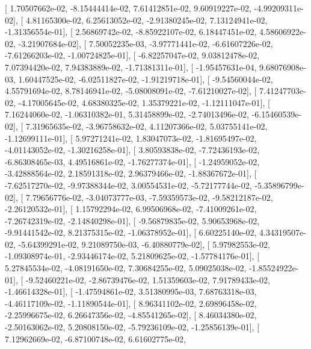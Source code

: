 \documentclass{article}
\begin{document}
       [  1.70507662e-02,  -8.15444414e-02,   7.61412851e-02,
          9.60919227e-02,  -4.99209311e-02],
       [  4.81165300e-02,   6.25613052e-02,  -2.91380245e-02,
          7.13124941e-02,  -1.31356554e-01],
       [  2.56869742e-02,  -8.85922107e-02,   6.18447451e-02,
          4.58606922e-02,  -3.21907684e-02],
       [  7.50052235e-03,  -3.97771441e-02,  -6.61607226e-02,
         -7.61266203e-02,  -1.00724825e-01],
       [ -6.82257047e-02,   9.03812478e-02,   7.07394420e-02,
          7.94383889e-02,  -1.71381311e-01],
       [ -1.95457631e-04,   9.68076908e-03,   1.60447525e-02,
         -6.02511827e-02,  -1.91219718e-01],
       [ -9.54560044e-02,   4.55791694e-02,   8.78146941e-02,
         -5.08008091e-02,  -7.61210027e-02],
       [  7.41247703e-02,  -4.17005645e-02,   4.68380325e-02,
          1.35379221e-02,  -1.12111047e-01],
       [  7.16244060e-02,  -1.06310382e-01,   5.31458899e-02,
         -2.74013496e-02,  -6.15460539e-02],
       [  7.31965635e-02,  -3.96758632e-02,   4.11207366e-02,
          5.03755141e-02,  -1.12699111e-01],
       [  5.97271241e-02,   1.83047073e-02,  -1.81695497e-02,
         -4.01143052e-02,  -1.30216258e-01],
       [  3.80593838e-02,  -7.72436193e-02,  -6.86308465e-03,
          4.49516861e-02,  -1.76277374e-01],
       [ -1.24959052e-02,  -3.42888564e-02,   2.18591318e-02,
          2.96379466e-02,  -1.88367672e-01],
       [ -7.62517270e-02,  -9.97388344e-02,   3.00554531e-02,
         -5.72177744e-02,  -5.35896799e-02],
       [  7.79656776e-02,  -3.04073777e-03,  -7.59359573e-02,
         -9.58212187e-02,  -2.26120532e-01],
       [  1.15792294e-02,   6.99506968e-02,  -7.41009261e-02,
         -7.26742319e-02,  -2.14840298e-01],
       [ -9.56879835e-02,   5.90653968e-02,  -9.91441542e-02,
          8.21375315e-02,  -1.06378952e-01],
       [  6.60225140e-02,   4.34319507e-02,  -5.64399291e-02,
          9.21089750e-03,  -6.40880779e-02],
       [  5.97982553e-02,  -1.09308974e-01,  -2.93446174e-02,
          5.21809625e-02,  -1.57784176e-01],
       [  5.27845534e-02,  -4.08191650e-02,   7.30684255e-02,
          5.09025038e-02,  -1.85524922e-01],
       [ -9.52460221e-02,  -2.86739476e-02,   1.51359603e-02,
          7.91789433e-02,  -1.46614328e-01],
       [ -1.47594861e-02,   3.51380995e-03,   7.68763318e-03,
         -4.46117109e-02,  -1.11890544e-01],
       [  8.96341102e-02,   2.69896458e-02,  -2.25996675e-02,
          6.26647356e-02,  -4.85541265e-02],
       [  8.46034380e-02,  -2.50163062e-02,   5.20808150e-02,
         -5.79236109e-02,  -1.25856139e-01],
       [  7.12962669e-02,  -6.87100748e-02,   6.61602775e-02,
\end{document}
